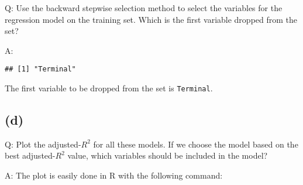 \documentclass[
]{article}
\newenvironment{Shaded}{\begin{snugshade}}{\end{snugshade}}
\newcommand{\CommentTok}[1]{\textcolor[rgb]{0.56,0.35,0.01}{\textit{#1}}}
\newcommand{\DataTypeTok}[1]{\textcolor[rgb]{0.13,0.29,0.53}{#1}}
\newcommand{\DecValTok}[1]{\textcolor[rgb]{0.00,0.00,0.81}{#1}}
\newcommand{\KeywordTok}[1]{\textcolor[rgb]{0.13,0.29,0.53}{\textbf{#1}}}
\newcommand{\NormalTok}[1]{#1}
\newcommand{\OperatorTok}[1]{\textcolor[rgb]{0.81,0.36,0.00}{\textbf{#1}}}
\newcommand{\OtherTok}[1]{\textcolor[rgb]{0.56,0.35,0.01}{#1}}
\newcommand{\StringTok}[1]{\textcolor[rgb]{0.31,0.60,0.02}{#1}}
\begin{document}
Q: Use the backward stepwise selection method to select the variables
for the regression model on the training set. Which is the first
variable dropped from the set?

A:

\begin{Shaded}
\end{Shaded}

\begin{verbatim}
## [1] "Terminal"
\end{verbatim}

The first variable to be dropped from the set is \texttt{Terminal}.

\hypertarget{fourd}{%
\subsection{(d)}\label{fourd}}

Q: Plot the adjusted-\(R^{2}\) for all these models. If we choose the
model based on the best adjusted-\(R^{2}\) value, which variables should
be included in the model?

A: The plot is easily done in R with the following command:

\begin{Shaded}
\end{Shaded}
\end{document}
